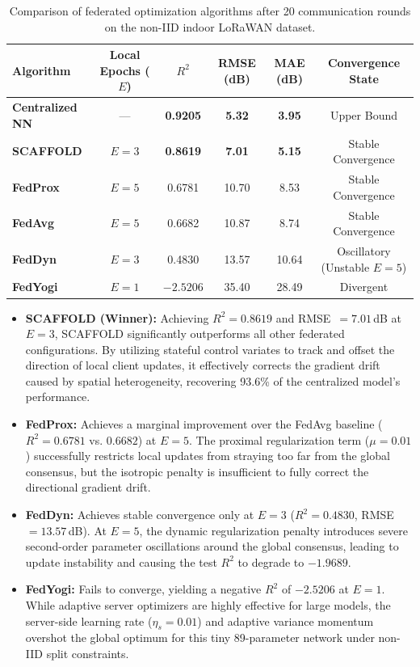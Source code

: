 \begin{table}[H]
  \centering
  \begin{tabular}{lccccc}
    \toprule
    \textbf{Algorithm} & \textbf{Local Epochs ($E$)} & \textbf{$R^2$} & \textbf{RMSE (dB)} & \textbf{MAE (dB)} & \textbf{Convergence State} \\
    \midrule
    \textbf{Centralized NN} & --- & \textbf{0.9205} & \textbf{5.32} & \textbf{3.95} & Upper Bound \\
    \midrule
    \textbf{SCAFFOLD} & $E=3$ & \textbf{0.8619} & \textbf{7.01} & \textbf{5.15} & Stable Convergence \\
    \textbf{FedProx} & $E=5$ & 0.6781 & 10.70 & 8.53 & Stable Convergence \\
    \textbf{FedAvg} & $E=5$ & 0.6682 & 10.87 & 8.74 & Stable Convergence \\
    \textbf{FedDyn} & $E=3$ & 0.4830 & 13.57 & 10.64 & Oscillatory (Unstable $E=5$) \\
    \textbf{FedYogi} & $E=1$ & $-2.5206$ & 35.40 & 28.49 & Divergent \\
    \bottomrule
  \end{tabular}
  \caption{Comparison of federated optimization algorithms after 20 communication rounds on the non-IID indoor LoRaWAN dataset.}
  \label{tab:comparison-algorithms}
\end{table}

\begin{itemize}
    \item \textbf{SCAFFOLD (Winner):} Achieving $R^2 = 0.8619$ and RMSE~$= 7.01$\,dB at $E=3$, SCAFFOLD significantly outperforms all other federated configurations. By utilizing stateful control variates to track and offset the direction of local client updates, it effectively corrects the gradient drift caused by spatial heterogeneity, recovering 93.6\% of the centralized model's performance.
    \item \textbf{FedProx:} Achieves a marginal improvement over the FedAvg baseline ($R^2 = 0.6781$ vs. $0.6682$) at $E=5$. The proximal regularization term ($\mu = 0.01$) successfully restricts local updates from straying too far from the global consensus, but the isotropic penalty is insufficient to fully correct the directional gradient drift.
    \item \textbf{FedDyn:} Achieves stable convergence only at $E=3$ ($R^2 = 0.4830$, RMSE~$= 13.57$\,dB). At $E=5$, the dynamic regularization penalty introduces severe second-order parameter oscillations around the global consensus, leading to update instability and causing the test $R^2$ to degrade to $-1.9689$.
    \item \textbf{FedYogi:} Fails to converge, yielding a negative $R^2$ of $-2.5206$ at $E=1$. While adaptive server optimizers are highly effective for large models, the server-side learning rate ($\eta_s = 0.01$) and adaptive variance momentum overshot the global optimum for this tiny 89-parameter network under non-IID split constraints.
\end{itemize}

